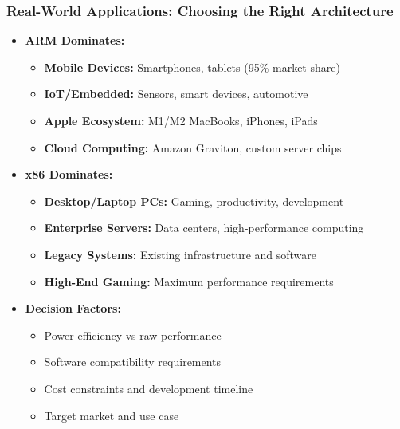 \begin{frame}
\frametitle{Real-World Applications: Choosing the Right Architecture}
\begin{itemize}
    \item \textbf{ARM Dominates:}
    \begin{itemize}
        \item \textbf{Mobile Devices:} Smartphones, tablets (95\% market share)
        \item \textbf{IoT/Embedded:} Sensors, smart devices, automotive
        \item \textbf{Apple Ecosystem:} M1/M2 MacBooks, iPhones, iPads
        \item \textbf{Cloud Computing:} Amazon Graviton, custom server chips
    \end{itemize}
    \item \textbf{x86 Dominates:}
    \begin{itemize}
        \item \textbf{Desktop/Laptop PCs:} Gaming, productivity, development
        \item \textbf{Enterprise Servers:} Data centers, high-performance computing
        \item \textbf{Legacy Systems:} Existing infrastructure and software
        \item \textbf{High-End Gaming:} Maximum performance requirements
    \end{itemize}
    \item \textbf{Decision Factors:}
    \begin{itemize}
        \item Power efficiency vs raw performance
        \item Software compatibility requirements
        \item Cost constraints and development timeline
        \item Target market and use case
    \end{itemize}
\end{itemize}
\end{frame}



